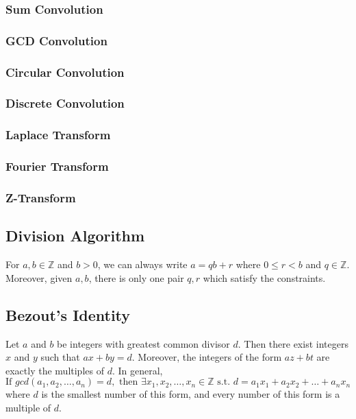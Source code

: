 \documentclass[12pt]{extarticle}
\begin{document}
\subsubsection*{Sum Convolution}
\subsubsection*{GCD Convolution}
\subsubsection*{Circular Convolution}
\subsubsection*{Discrete Convolution}
\subsubsection*{Laplace Transform}
\subsubsection*{Fourier Transform}
\subsubsection*{Z-Transform}


\subsection*{Division Algorithm}
For $a,b\in\mathbb{Z}$ and $b>0$, we can always write $a=qb+r$ where $0\leq r<b$ and $q\in\mathbb{Z}$. Moreover, given $a,b$, there is only one pair $q,r$ which satisfy the constraints.
\subsection*{Bezout's Identity}
Let $a$ and $b$ be integers with greatest common divisor $d$. Then there exist integers $x$ and $y$ such that $ax + by = d$. Moreover, the integers of the form $az + bt$ are exactly the multiples of $d$. In general,
$$\text{If }gcd(a_{1},a_{2},\dots,a_{n})=d, \text{ then }\exists x_{1},x_{2},\dots,x_{n} \in\mathbb{Z} \text{ s.t. } d=a_{1}x_{1}+a_{2}x_{2}+\dots+a_{n}x_{n}$$ where $d$ is the smallest number of this form, and every number of this form is a multiple of $d$.
\end{document}
